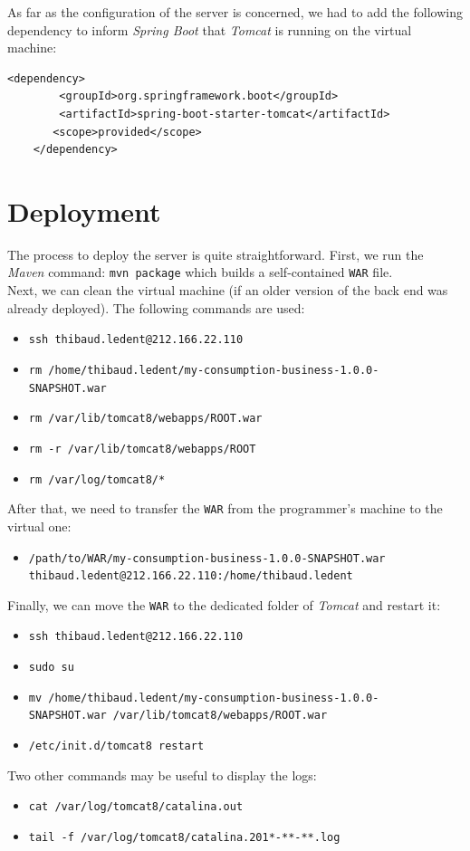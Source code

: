\documentclass[a4paper, oneside, 11pt]{book}
\begin{document}
As far as the configuration of the server is concerned, we had to add the following dependency to inform \textit{Spring Boot} that \textit{Tomcat} is running on the virtual machine:
\begin{lstlisting}[breaklines]
	<dependency>
	    <groupId>org.springframework.boot</groupId>
	    <artifactId>spring-boot-starter-tomcat</artifactId>
	   <scope>provided</scope>
	</dependency>
\end{lstlisting}

\section*{Deployment}
The process to deploy the server is quite straightforward. First, we run the \textit{Maven} command: \texttt{mvn package} which builds a self-contained \texttt{WAR} file.\\

Next, we can clean the virtual machine (if an older version of the back end was already deployed). The following commands are used:
\begin{itemize}
	\item \texttt{ssh thibaud.ledent@212.166.22.110}
	\item \texttt{rm /home/thibaud.ledent/my-consumption-business-1.0.0-} \\ \verb!SNAPSHOT.war!
	\item \texttt{rm /var/lib/tomcat8/webapps/ROOT.war}
	\item \texttt{rm -r /var/lib/tomcat8/webapps/ROOT}
	\item \texttt{rm /var/log/tomcat8/*}
\end{itemize}
After that, we need to transfer the \texttt{WAR} from the programmer’s machine to the virtual one: 
\begin{itemize}
	\item \texttt{/path/to/WAR/my-consumption-business-1.0.0-SNAPSHOT.war} \\ \verb!thibaud.ledent@212.166.22.110:/home/thibaud.ledent!
\end{itemize}
Finally, we can move the \texttt{WAR} to the dedicated folder of \textit{Tomcat} and restart it:
\begin{itemize}
	\item \texttt{ssh thibaud.ledent@212.166.22.110}
	\item \texttt{sudo su}
	\item \texttt{mv /home/thibaud.ledent/my-consumption-business-1.0.0-} \\
	\verb!SNAPSHOT.war /var/lib/tomcat8/webapps/ROOT.war!
	\item \texttt{/etc/init.d/tomcat8 restart}
\end{itemize}
Two other commands may be useful to display the logs:
\begin{itemize}
	\item \texttt{cat /var/log/tomcat8/catalina.out}
	\item \texttt{tail -f /var/log/tomcat8/catalina.201*-**-**.log}
\end{itemize}
\end{document}
